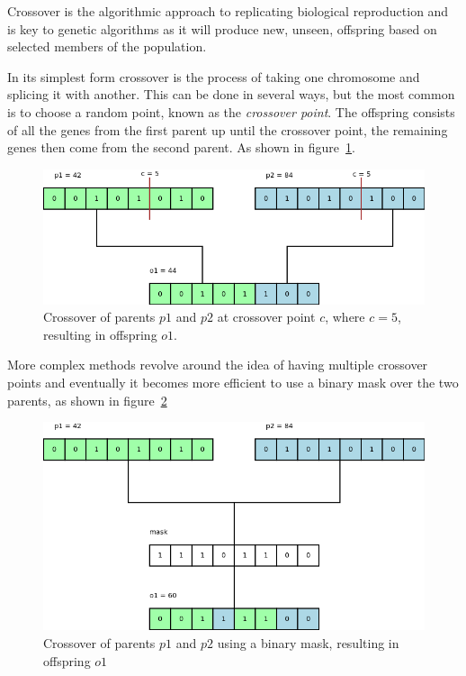 \documentclass[10pt, a4paper]{article}
\begin{document}
Crossover is the algorithmic approach to replicating biological reproduction
and is key to genetic algorithms as it will produce new, unseen, offspring
based on selected members of the population.

In its simplest form crossover is the process of taking one chromosome and
splicing it with another. This can be done in several ways, but the most common
is to choose a random point, known as the \textit{crossover point}. The
offspring consists of all the genes from the first parent up until the 
crossover point, the remaining genes then come from the second parent. As shown
in figure~\ref{fig:crossover-point}.

\begin{figure}[h]
\centering
\includegraphics[scale=0.45]{img/crossover.png}
\caption{Crossover of parents $p1$ and $p2$ at crossover point $c$, where 
         $c=5$, resulting in offspring $o1$.} 
\label{fig:crossover-point}
\end{figure}

More complex methods revolve around the idea of having multiple crossover 
points and eventually it becomes more efficient to use a binary mask over
the two parents, as shown in figure~\ref{fig:crossover-mask}

\begin{figure}[h]
\includegraphics[scale=0.45]{img/mask-crossover.png}
\caption{Crossover of parents $p1$ and $p2$ using a binary mask, resulting in
         offspring $o1$}
\label{fig:crossover-mask}
\end{figure}
\end{document}
